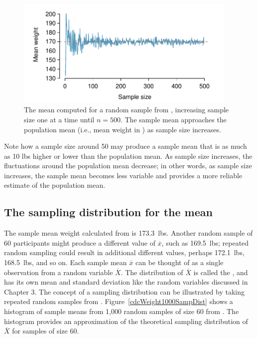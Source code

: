 \begin{figure}[h]
	\centering
	\includegraphics[width=0.95\textwidth]{ch_inference_foundations_oi_biostat/figures/cdcWeightRunningMean/cdcWeightRunningMeanNew.pdf}
	\caption{The mean  computed for a random sample from , increasing sample size one at a time until $n = 500$. The sample mean approaches the population mean (i.e., mean weight in ) as sample size increases.}
	\label{cdcWeightRunningMean}
\end{figure}

Note how a sample size around 50 may produce a sample mean that is as much as 10 lbs higher or lower than the population mean. As sample size increases, the fluctuations around the population mean decrease; in other words, as sample size increases, the sample mean becomes less variable and provides a more reliable estimate of the population mean.


\textD{\newpage}


\subsection{The sampling distribution for the mean}
\label{samplingDistributionForMean}

The sample mean weight calculated from  is 173.3~lbs. Another random sample of 60 participants might produce a different value of $\overline{x}$, such as 169.5~lbs; repeated random sampling could result in additional different values, perhaps 172.1~lbs, 168.5~lbs, and so on. Each sample mean $\overline{x}$ can be thought of as a single observation from a random variable $\overline{X}$. The distribution of $\overline{X}$ is called the , and has its own mean and standard deviation like the random variables discussed in Chapter 3. The concept of a sampling distribution can be illustrated by taking repeated random samples from . Figure~\ref{cdcWeight1000SampDist} shows a histogram of sample means from 1,000 random samples of size 60 from . The histogram provides an approximation of the theoretical sampling distribution of $\overline{X}$ for samples of size 60. 

